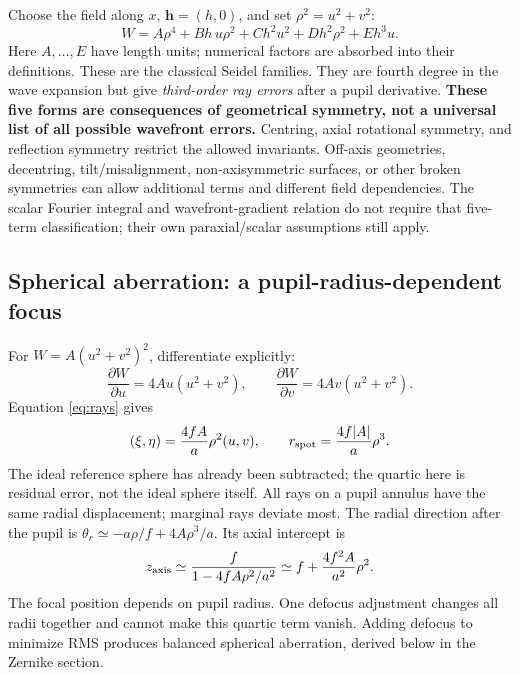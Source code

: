 Choose the field along $x$, $\mathbf h=(h,0)$, and set $\rho^2=u^2+v^2$:
\begin{equation}
\boxed{W=A\rho^4+Bh\,u\rho^2+Ch^2u^2+Dh^2\rho^2+Eh^3u.}
\label{eq:seidel}
\end{equation}
Here $A,\ldots,E$ have length units; numerical factors are absorbed into their definitions. These are the classical Seidel families. They are fourth degree in the wave expansion but give \emph{third-order ray errors} after a pupil derivative. \textbf{These five forms are consequences of geometrical symmetry, not a universal list of all possible wavefront errors.} Centring, axial rotational symmetry, and reflection symmetry restrict the allowed invariants. Off-axis geometries, decentring, tilt/misalignment, non-axisymmetric surfaces, or other broken symmetries can allow additional terms and different field dependencies. The scalar Fourier integral and wavefront-gradient relation do not require that five-term classification; their own paraxial/scalar assumptions still apply.

\subsection{Spherical aberration: a pupil-radius-dependent focus}
For $W=A(u^2+v^2)^2$, differentiate explicitly:
\begin{equation}
\frac{\partial W}{\partial u}=4Au(u^2+v^2),\qquad
\frac{\partial W}{\partial v}=4Av(u^2+v^2).
\end{equation}
Equation \eqref{eq:rays} gives
\begin{equation}
(\xi,\eta)=\frac{4fA}{a}\rho^2(u,v),\qquad
r_{\rm spot}=\frac{4f|A|}{a}\rho^3.
\end{equation}
The ideal reference sphere has already been subtracted; the quartic here is residual error, not the ideal sphere itself. All rays on a pupil annulus have the same radial displacement; marginal rays deviate most. The radial direction after the pupil is
$\theta_r\simeq-a\rho/f+4A\rho^3/a$. Its axial intercept is
\begin{equation}
z_{\rm axis}\simeq\frac{f}{1-4fA\rho^2/a^2}
\simeq f+\frac{4f^2A}{a^2}\rho^2.
\end{equation}
The focal position depends on pupil radius. One defocus adjustment changes all radii together and cannot make this quartic term vanish. Adding defocus to minimize RMS produces balanced spherical aberration, derived below in the Zernike section.

